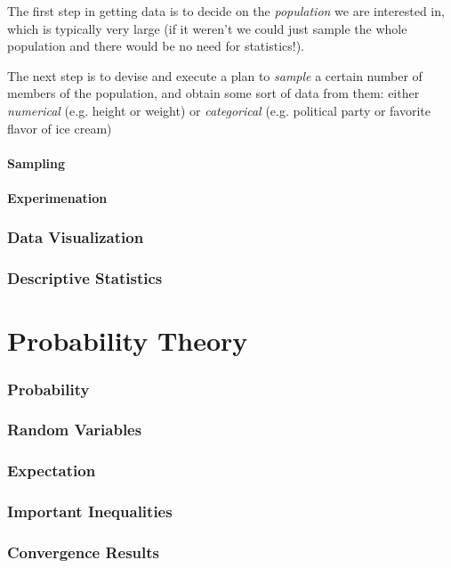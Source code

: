 \documentclass{article}
\begin{document}
The first step in getting data is to decide on the \textit{population} we are interested in, which is typically very large (if it weren't we could just sample the whole population and there would be no need for statistics!). 

The next step is to devise and execute a plan to \textit{sample} a certain number of members of the population, and obtain some sort of data from them: either \textit{numerical} (e.g. height or weight) or \textit{categorical} (e.g. political party or favorite flavor of ice cream)



\subsection{Sampling}

\subsection{Experimenation}


\section{Data Visualization}
\section{Descriptive Statistics}

\newpage
\part{Probability Theory}
\section{Probability}
\section{Random Variables}
\section{Expectation}
\section{Important Inequalities}
\section{Convergence Results}
\end{document}
